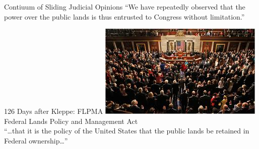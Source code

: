{\begin{frame}[t]{Contiuum of Sliding Judicial Opinions}
{        ``We have repeatedly observed that the power over the public lands is
        thus entrusted to Congress without limitation.'' \\
    }
\end{frame}
}%



\begin{frame}{126 Days after Kleppe: FLPMA}
    \centering
    \includegraphics[width=.8\textwidth]{img/congress.png} \\
    Federal Lands Policy and Management Act \\
    { \large ``\ldots that it is the policy of the United States that the
    public lands be retained in Federal ownership\ldots'' }
\end{frame}

